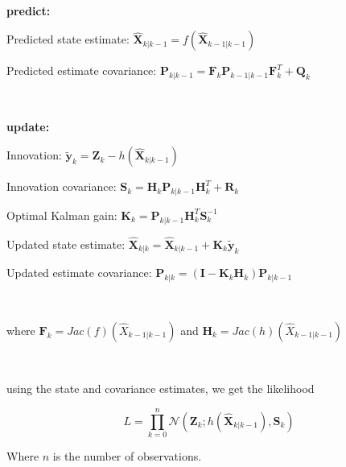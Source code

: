 \

\textbf{predict:}

Predicted state estimate: $\bm{\hat X}_{k|k-1} = f(\bm{\hat X}_{k-1|k-1} )$

Predicted estimate covariance: $\textbf{P}_{k|k-1} = \textbf{F}_k\textbf{P}_{k-1|k-1} \textbf{F}_k^T + \textbf{Q}_k$

\

\textbf{update:}

Innovation: $\bm{\tilde y}_{k} = \textbf{Z}_k - h(\bm{\hat X}_{k|k-1})$

Innovation covariance: $\textbf{S}_k = \textbf{H}_k \textbf{P}_{k|k-1}\textbf{H}_k^T + \textbf{R}_k$

Optimal Kalman gain: $\textbf{K}_k = \textbf{P}_{k|k-1} \textbf{H}_k^T \textbf{S}_k^{-1}$

Updated state estimate: $\bm{\hat X}_{k|k} = \bm{\hat X}_{k|k-1} + \textbf{K}_k \bm{\tilde y}_{k}$

Updated estimate covariance: $\textbf{P}_{k|k} = (\textbf{I} - \textbf{K}_k \textbf{H}_k)\textbf{P}_{k|k-1}$



\

where $\textbf{F}_k = Jac (f)(\hat{X}_{k-1|k-1})$ and $\textbf{H}_k = Jac( h)(\hat{X}_{k-1|k-1})$

\

using the state and covariance estimates, we get the likelihood 

$$L = \prod_{k=0}^n \mathcal{N}(\textbf{Z}_k; h(\hat{\textbf{X}}_{k|k-1}), \textbf{S}_k) \label{eq: EKF likelihood}$$

Where $n$ is the number of observations.\parencite{kulikov_extended_2024}

